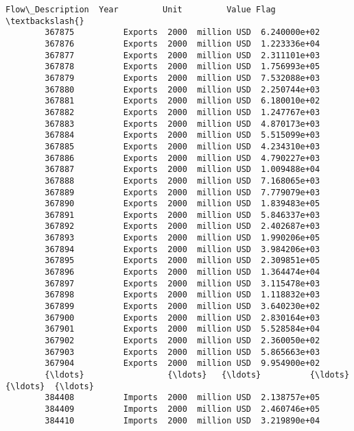 \documentclass[11pt]{article}
\begin{document}
\begin{Verbatim}[commandchars=\\\{\}]
               Flow\_Description  Year         Unit         Value Flag  \textbackslash{}
        367875          Exports  2000  million USD  6.240000e+02        
        367876          Exports  2000  million USD  1.223336e+04        
        367877          Exports  2000  million USD  2.311101e+03        
        367878          Exports  2000  million USD  1.756993e+05        
        367879          Exports  2000  million USD  7.532088e+03        
        367880          Exports  2000  million USD  2.250744e+03        
        367881          Exports  2000  million USD  6.180010e+02        
        367882          Exports  2000  million USD  1.247767e+03        
        367883          Exports  2000  million USD  4.870173e+03        
        367884          Exports  2000  million USD  5.515099e+03        
        367885          Exports  2000  million USD  4.234310e+03        
        367886          Exports  2000  million USD  4.790227e+03        
        367887          Exports  2000  million USD  1.009488e+04        
        367888          Exports  2000  million USD  7.168065e+03        
        367889          Exports  2000  million USD  7.779079e+03        
        367890          Exports  2000  million USD  1.839483e+05        
        367891          Exports  2000  million USD  5.846337e+03        
        367892          Exports  2000  million USD  2.402687e+03        
        367893          Exports  2000  million USD  1.990206e+05        
        367894          Exports  2000  million USD  3.984206e+03        
        367895          Exports  2000  million USD  2.309851e+05        
        367896          Exports  2000  million USD  1.364474e+04        
        367897          Exports  2000  million USD  3.115478e+03        
        367898          Exports  2000  million USD  1.118832e+03        
        367899          Exports  2000  million USD  3.640230e+02        
        367900          Exports  2000  million USD  2.830164e+03        
        367901          Exports  2000  million USD  5.528584e+04        
        367902          Exports  2000  million USD  2.360050e+02        
        367903          Exports  2000  million USD  5.865663e+03        
        367904          Exports  2000  million USD  9.954900e+02        
        {\ldots}                 {\ldots}   {\ldots}          {\ldots}           {\ldots}  {\ldots}   
        384408          Imports  2000  million USD  2.138757e+05        
        384409          Imports  2000  million USD  2.460746e+05        
        384410          Imports  2000  million USD  3.219890e+04        

\end{Verbatim}
\end{document}
